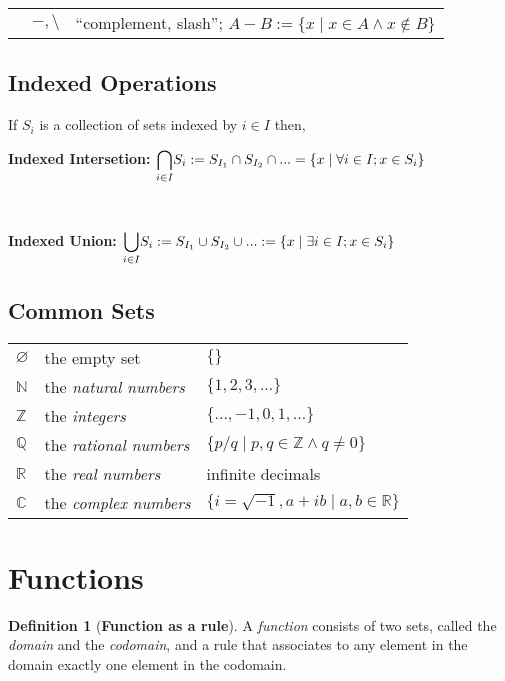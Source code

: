 \documentclass[a4paper, 12pt]{report}
\theoremstyle{definition}
\newtheorem{define}{Definition}
\begin{document}
\begin{doublespace}
\begin{tabular}{lcl}
& \(-, \setminus \) & ``complement, slash'';
\(A - B := \{x \mid x \in A \land x \notin B\}\)\\

\end{tabular}

\subsection{Indexed Operations}

If \(S_i\) is a collection of sets indexed by \(i \in I\) then,

\textbf{Indexed Intersetion:} \(\mathlarger{\bigcap}_{i \in I}S_i
:= S_{I_1} \cap S_{I_2} \cap ...
= \{x \mid \forall i \in I; x \in S_i\}\)

\

\textbf{Indexed Union:} \(\mathlarger{\bigcup}_{i \in I}S_i
:= S_{I_1} \cup S_{I_2} \cup ...
:= \{x \mid \exists i \in I; x \in S_i\}\)


\subsection{Common Sets}
\begin{tabular}{lll}

\(\varnothing\) & the empty set & \(\{\}\) \\

\(\mathbb{N}\) & the \textit{natural numbers} & \(\{1, 2, 3, ...\}\)\\

\(\mathbb{Z}\) & the \textit{integers} & \(\{..., -1, 0, 1, ...\}\)\\

\(\mathbb{Q}\) & the \textit{rational numbers} &
\(\{p/q \mid p,q \in \mathbb{Z} \land q \neq 0\}\)\\

\(\mathbb{R}\) & the \textit{real numbers} & infinite decimals\\

\(\mathbb{C}\) & the \textit{complex numbers} &
\(\{i = \sqrt{-1}, a + ib \mid a, b \in \mathbb{R}\}\)\\
\end{tabular}

\pagebreak

\section{Functions}

\begin{singlespace}
\begin{define}[\textbf{Function as a rule}]
    A \textit{function} consists of two sets, called the \textit{domain} and the
    \textit{codomain}, and a rule that associates to any element in the domain
    exactly one element in the codomain.
\end{define}


\end{singlespace}
\end{doublespace}
\end{document}
